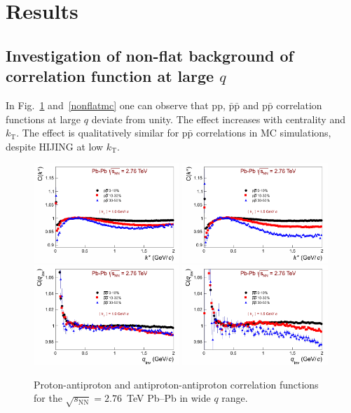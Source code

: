 \section{Results}

\subsection{Investigation of non-flat background of correlation function at large $q$}
In Fig.~\ref{nonflat} and~\ref{nonflatmc} one can observe that pp, $\bar{\mathrm{p}}\bar{\mathrm{p}}$ and p$\bar{\mathrm{p}}$ correlation functions at large $q$ deviate from unity. The effect increases with centrality and $k_{\mathrm T}$. The effect is qualitatively similar for p$\bar{\mathrm{p}}$ correlations in MC simulations, despite HIJING at low $k_{\mathrm T}$.

\begin{figure}%
  \centering
  \includegraphics[width=0.49\textwidth]{papnf}
  \includegraphics[width=0.49\textwidth]{papnf2}
  \includegraphics[width=0.49\textwidth]{apapnf}
  \includegraphics[width=0.49\textwidth]{apapnf2}
  \caption{Proton-antiproton and antiproton-antiproton correlation functions for the $\sqrt{s_{\mathrm{NN}}}=2.76$~TeV Pb--Pb in wide $q$ range.}
  \label{nonflat}
\end{figure}

